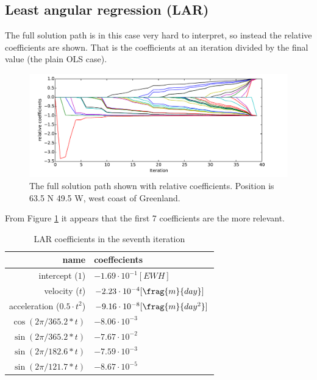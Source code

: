 \pagebreak
\subsection{Least angular regression (LAR)}

The full solution path is in this case very hard to interpret, so instead the relative coefficients are shown. That is the coefficients at an iteration divided by the final value (the plain OLS case).

\begin{figure}[H]
	\centering
	\includegraphics[width=\textwidth]{figures/lar-coefficients}
	\caption{The full solution path shown with relative coefficients. Position is 63.5 N 49.5 W, west coast of Greenland.}
	\label{fig:lar-coefficients}
\end{figure}

From Figure \ref{fig:lar-coefficients} it appears that the first 7 coefficients are the more relevant. 
\begin{table}[H]
\centering
\begin{tabular}{r|l}
name                 & coeffecients \\ \hline
intercept ($1$) & $-1.69 \cdot 10^{-1}[EWH]$ \\
velocity ($t$) & $-2.23 \cdot 10^{-4} [\frag{m}{day}]$ \\
acceleration ($0.5 \cdot t^2$) & $-9.16 \cdot 10^{-8} [\frag{m}{day^2}] $ \\
$\cos(2 \pi /365.2 * t)$ & $-8.06 \cdot 10^{-3}$ \\
$\sin(2 \pi /365.2 * t)$ & $-7.67 \cdot 10^{-2}$ \\
$\sin(2 \pi /182.6 * t)$ & $-7.59 \cdot 10^{-3}$ \\
$\sin(2 \pi /121.7 * t)$ & $-8.67 \cdot 10^{-5}$
\end{tabular}
\caption{LAR coefficients in the seventh iteration}
\end{table}

